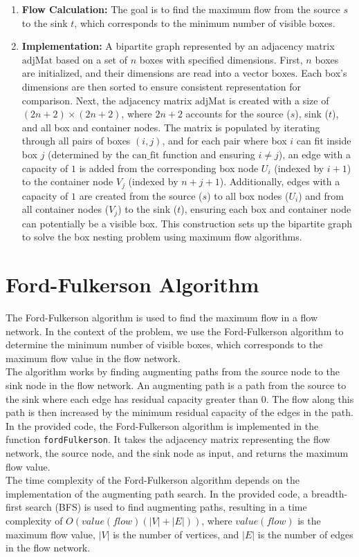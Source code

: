 \documentclass{article}
\begin{document}
\begin{enumerate}
  \item \textbf{Flow Calculation:} The goal is to find the maximum flow from the source $s$ to the sink $t$, which corresponds to the minimum number of visible boxes.

  \item \textbf{Implementation:}
  A bipartite graph represented by an adjacency matrix $\text{adjMat}$ based on a set of $n$ boxes with specified dimensions. First, $n$ boxes are initialized, and their dimensions are read into a vector $\text{boxes}$. Each box's dimensions are then sorted to ensure consistent representation for comparison. Next, the adjacency matrix $\text{adjMat}$ is created with a size of $(2n + 2) \times (2n + 2)$, where $2n + 2$ accounts for the source ($s$), sink ($t$), and all box and container nodes. The matrix is populated by iterating through all pairs of boxes $(i, j)$, and for each pair where box $i$ can fit inside box $j$ (determined by the $\text{can\_fit}$ function and ensuring $i \neq j$), an edge with a capacity of $1$ is added from the corresponding box node $U_i$ (indexed by $i + 1$) to the container node $V_j$ (indexed by $n + j + 1$). Additionally, edges with a capacity of $1$ are created from the source ($s$) to all box nodes ($U_i$) and from all container nodes ($V_j$) to the sink ($t$), ensuring each box and container node can potentially be a visible box. This construction sets up the bipartite graph to solve the box nesting problem using maximum flow algorithms.
\end{enumerate}

\section*{Ford-Fulkerson Algorithm}

The Ford-Fulkerson algorithm is used to find the maximum flow in a flow network. In the context of the problem, we use the Ford-Fulkerson algorithm to determine the minimum number of visible boxes, which corresponds to the maximum flow value in the flow network.
\\
The algorithm works by finding augmenting paths from the source node to the sink node in the flow network. An augmenting path is a path from the source to the sink where each edge has residual capacity greater than 0. The flow along this path is then increased by the minimum residual capacity of the edges in the path.
\\
In the provided code, the Ford-Fulkerson algorithm is implemented in the function \texttt{fordFulkerson}. It takes the adjacency matrix representing the flow network, the source node, and the sink node as input, and returns the maximum flow value.
\\
The time complexity of the Ford-Fulkerson algorithm depends on the implementation of the augmenting path search. In the provided code, a breadth-first search (BFS) is used to find augmenting paths, resulting in a time complexity of $O(value(flow)(|V| + |E|))$, where $value(flow)$ is the maximum flow value, $|V|$ is the number of vertices, and $|E|$ is the number of edges in the flow network.
\end{document}

